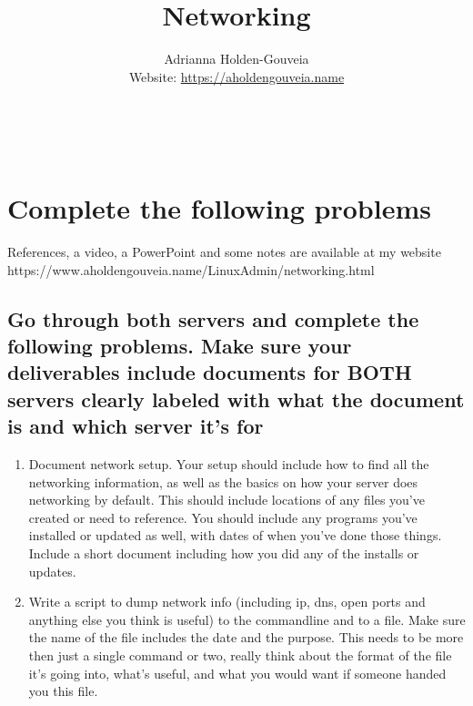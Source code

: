 \documentclass[12pt]{article}
\title{Networking}
\author{
        Adrianna Holden-Gouveia \\
        Website: \url{https://aholdengouveia.name}\\ 
        \date{\vspace{-5ex}}
        \faLinkedin{: aholdengouveia} \\
        \faGithub {: aholdengouveia} \\
        }
\begin{document}
    

\maketitle


\section*{Complete the following problems}

References, a video, a PowerPoint and some notes are available at my website
https://www.aholdengouveia.name/LinuxAdmin/networking.html



\subsection*{Go through both servers and complete the following problems.  Make sure your deliverables include documents for BOTH servers clearly labeled with what the document is and which server it's for}
    \begin{enumerate}
        \item Document network setup. Your setup should include how to find all the networking information, as well as the basics on how your server does networking by default. This should include locations of any files you've created or need to reference. You should include any programs you've installed or updated as well, with dates of when you've done those things. Include a short document including how you did any of the installs or updates. 
        \item Write a script to dump network info (including ip, dns, open ports and anything else you think is useful) to the commandline and to a file.  Make sure the name of the file includes the date and the purpose.  This needs to be more then just a single command or two, really think about the format of the file it's going into, what's useful, and what you would want if someone handed you this file. 
    \end{enumerate}
\end{document}
